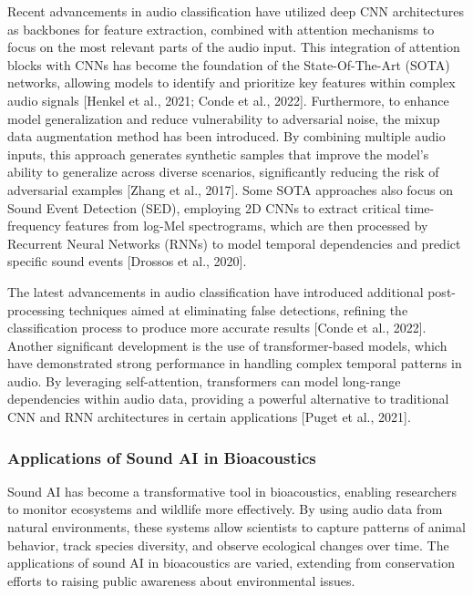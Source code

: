Recent advancements in audio classification have utilized deep CNN architectures as backbones for feature extraction, combined with attention mechanisms to focus on the most relevant parts of the audio input. This integration of attention blocks with CNNs has become the foundation of the State-Of-The-Art (SOTA) networks, allowing models to identify and prioritize key features within complex audio signals [Henkel et al., 2021; Conde et al., 2022]. Furthermore, to enhance model generalization and reduce vulnerability to adversarial noise, the mixup data augmentation method has been introduced. By combining multiple audio inputs, this approach generates synthetic samples that improve the model’s ability to generalize across diverse scenarios, significantly reducing the risk of adversarial examples [Zhang et al., 2017]. Some SOTA approaches also focus on Sound Event Detection (SED), employing 2D CNNs to extract critical time-frequency features from log-Mel spectrograms, which are then processed by Recurrent Neural Networks (RNNs) to model temporal dependencies and predict specific sound events [Drossos et al., 2020].

The latest advancements in audio classification have introduced additional post-processing techniques aimed at eliminating false detections, refining the classification process to produce more accurate results [Conde et al., 2022]. Another significant development is the use of transformer-based models, which have demonstrated strong performance in handling complex temporal patterns in audio. By leveraging self-attention, transformers can model long-range dependencies within audio data, providing a powerful alternative to traditional CNN and RNN architectures in certain applications [Puget et al., 2021].

\subsubsection{Applications of Sound AI in Bioacoustics}

Sound AI has become a transformative tool in bioacoustics, enabling researchers to monitor ecosystems and wildlife more effectively. By using audio data from natural environments, these systems allow scientists to capture patterns of animal behavior, track species diversity, and observe ecological changes over time. The applications of sound AI in bioacoustics are varied, extending from conservation efforts to raising public awareness about environmental issues.

